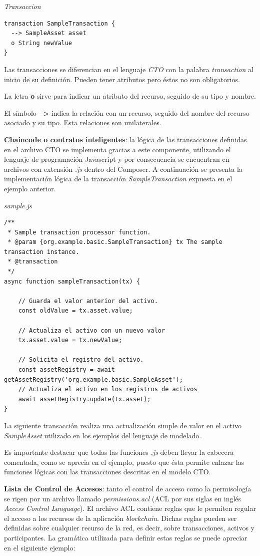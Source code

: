 \textit{Transaccion}
\begin{lstlisting}
transaction SampleTransaction {
  --> SampleAsset asset
  o String newValue
}
\end{lstlisting}
Las transacciones se diferencian en el lenguaje \textit{CTO} con la palabra \textit{transaction} al inicio de su definición. Pueden tener atributos pero  éstos no son obligatorios.

La letra \textbf{o} sirve para indicar un atributo del recurso, seguido de su tipo y nombre.

El símbolo \textbf{-->} indica la relación con un recurso, seguido del nombre del recurso asociado y su tipo. Esta relaciones son unilaterales.

\textbf{Chaincode o contratos inteligentes}: la lógica de las transacciones definidas en el archivo CTO se implementa gracias a este componente, utilizando el lenguaje de programación Javascript y por consecuencia se encuentran en archivos con extensión \textit{.js} dentro del Composer. A continuación se presenta la implementación lógica de la transacción \textit{SampleTransaction} expuesta en el ejemplo anterior.

\textit{sample.js}
\begin{lstlisting}
/**
 * Sample transaction processor function.
 * @param {org.example.basic.SampleTransaction} tx The sample transaction instance.
 * @transaction
 */
async function sampleTransaction(tx) { 

    // Guarda el valor anterior del activo.
    const oldValue = tx.asset.value;

    // Actualiza el activo con un nuevo valor
    tx.asset.value = tx.newValue;

    // Solicita el registro del activo.
    const assetRegistry = await getAssetRegistry('org.example.basic.SampleAsset');
    // Actualiza el activo en los registros de activos
    await assetRegistry.update(tx.asset);
}
\end{lstlisting}
La siguiente transacción realiza una actualización simple de valor en el activo \textit{SampleAsset} utilizado en los ejemplos del lenguaje de modelado.

Es importante destacar que todas las funciones \textit{.js} deben llevar la cabecera comentada, como se aprecia en el ejemplo, puesto que ésta permite enlazar las funciones lógicas con las transacciones descritas en el modelo CTO.

\textbf{Lista de Control de Accesos}: tanto el control de acceso como la permisología se rigen por un archivo llamado \textit{permissions.acl} (ACL por sus siglas en inglés {\it Access Control Language}). El archivo ACL contiene reglas que le permiten regular el acceso a los recursos de la aplicación \textit{blockchain}. Dichas reglas pueden ser definidas sobre cualquier recurso de la red, es decir, sobre transacciones, activos y participantes. La gramática utilizada para definir estas reglas se puede apreciar en el siguiente ejemplo:

